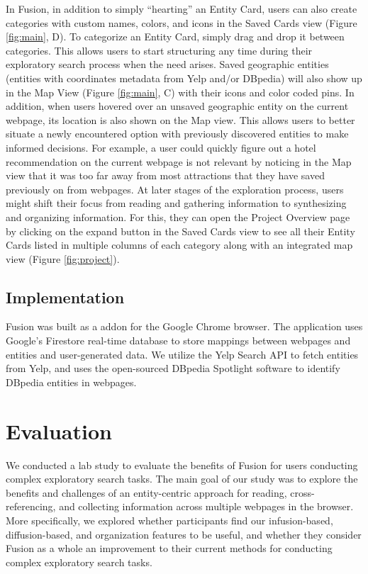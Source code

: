 In Fusion, in addition to simply ``hearting'' an Entity Card, users can also create categories with custom names, colors, and icons in the Saved Cards view (Figure \ref{fig:main}, D). To categorize an Entity Card, simply drag and drop it between categories. This allows users to start structuring any time during their exploratory search process when the need arises. Saved geographic entities (entities with coordinates metadata from Yelp and/or DBpedia) will also show up in the Map View  (Figure \ref{fig:main}, C) with their icons and color coded pins. In addition, when users hovered over an unsaved geographic entity on the current webpage, its location is also shown on the Map view. This allows users to better situate a newly encountered option with previously discovered entities to make informed decisions. For example, a user could quickly figure out a hotel recommendation on the current webpage is not relevant by noticing in the Map view that it was too far away from most attractions that they have saved previously on from webpages. At later stages of the exploration process, users might shift their focus from reading and gathering information to synthesizing and organizing information. For this, they can open the Project Overview page by clicking on the expand button in the Saved Cards view to see all their Entity Cards listed in multiple columns of each category along with an integrated map view (Figure \ref{fig:project}).

\subsection{Implementation}

Fusion was built as a addon for the Google Chrome browser. The application uses Google's Firestore real-time database to store mappings between webpages and entities and user-generated data. We utilize the Yelp Search API to fetch entities from Yelp, and uses the open-sourced DBpedia Spotlight \cite{spotlight} software to identify DBpedia entities \cite{dbpedia} in webpages.

\section{Evaluation}
We conducted a lab study to evaluate the benefits of Fusion for users conducting complex exploratory search tasks. The main goal of our study was to explore the benefits and challenges of an entity-centric approach for reading, cross-referencing, and collecting information across multiple webpages in the browser. More specifically, we explored whether participants find our infusion-based, diffusion-based, and organization features to be useful, and whether they consider Fusion as a whole an improvement to their current methods for conducting complex exploratory search tasks. 

